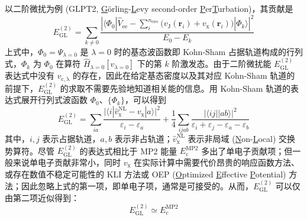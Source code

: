 以二阶微扰为例 (GLPT2, \underline{G}\"orling-\underline{L}evy second-order \underline{P}er\underline{T}urbation)，其贡献是
\begin{equation}
  E_\mathrm{GL}^{(2)} = \sum_{k \neq 0} \frac{\displaystyle \left| \langle \Phi_0 | \hat V_\mathrm{ee} - \sum_i^{n_\mathrm{elec}} \big( v_\mathrm{J} (\bm{r}_i) + v_\mathrm{x} (\bm{r}_i) \big) | \Phi_k \rangle \right|^2}{E_0 - E_k}
\end{equation}
上式中，$\Phi_{0} = \Psi_{\lambda=0}$ 是 $\lambda = 0$ 时的基态波函数即 Kohn-Sham 占据轨道构成的行列式，$\Phi_{k}$ 为 $\Phi_{0}$ 在算符 $\hat H_{\lambda=0} [v_{\lambda=0}]$ 下的第 $k$ 阶激发态。由于二阶微扰能 $E_\mathrm{GL}^{(2)}$ 表达式中没有 $v_\mathrm{c, \lambda}$ 的存在，因此在给定基态密度以及其对应 Kohn-Sham 轨道的前提下，$E_\mathrm{GL}^{(2)}$ 的求取不需要先验地知道相关能的信息。用 Kohn-Sham 轨道的表达式展开行列式波函数 $\Phi_0$、$\{\Phi_k\}$，可以得到
\begin{equation}
  E_\mathrm{GL}^{(2)} = \sum_{ia} \frac{\big| \langle i | \hat v_\mathrm{x}^\mathrm{NL} - v_\mathrm{x} | a \rangle \big|^2}{\varepsilon_i - \varepsilon_a} + \frac{1}{4} \sum_{ijab} \frac{\big| \langle ij || ab \rangle \big|^2}{\varepsilon_i + \varepsilon_j - \varepsilon_a - \varepsilon_b}
\end{equation}
其中，$i, j$ 表示占据轨道，$a, b$ 表示非占轨道；$\hat v_\mathrm{x}^\mathrm{NL}$ 表示非局域 (\underline{N}on-\underline{L}ocal) 交换势算符。尽管 $E_\mathrm{GL}^{(2)}$ 的表达式相比于 MP2 能量 $E_\mathrm{c}^\mathrm{MP2}$ 多出了单电子贡献项；但一般来说单电子贡献非常小\cite{DellaSala-Goerling.JCP.2001}，同时 $v_\mathrm{x}$ 在实际计算中需要代价昂贵的响应函数方法\cite{Goerling-Goerling.PRL.1999}、或存在数值不稳定可能性的 KLI 方法\cite{Krieger-Iafrate.PRA.1992, DellaSala-Goerling.JCP.2001}或 OEP (\underline{O}ptimized \underline{E}ffective \underline{P}otential) 方法\cite{Mori-Sanchez-Yang.JCP.2005}；因此忽略上式的第一项，即单电子项，通常是可接受的。从而，$E_\mathrm{GL}^{(2)}$ 可以仅由第二项近似得到：
\begin{equation}
  E_\mathrm{GL}^{(2)} \simeq E_\mathrm{c}^\mathrm{MP2}
\end{equation}

